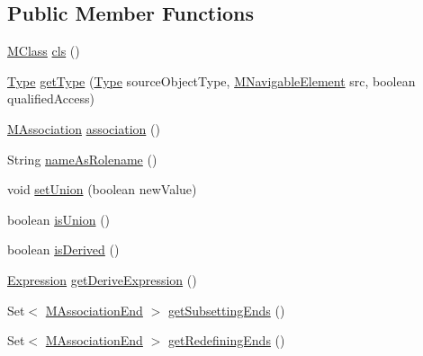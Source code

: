 \subsection*{Public Member Functions}
\begin{DoxyCompactItemize}
\item 
\hyperlink{interfaceorg_1_1tzi_1_1use_1_1uml_1_1mm_1_1_m_class}{M\-Class} \hyperlink{interfaceorg_1_1tzi_1_1use_1_1uml_1_1mm_1_1_m_navigable_element_a5965e78e0a14270855a4eea4418e1e4b}{cls} ()
\item 
\hyperlink{interfaceorg_1_1tzi_1_1use_1_1uml_1_1ocl_1_1type_1_1_type}{Type} \hyperlink{interfaceorg_1_1tzi_1_1use_1_1uml_1_1mm_1_1_m_navigable_element_af93a2b85491be095d44d8bd81a284258}{get\-Type} (\hyperlink{interfaceorg_1_1tzi_1_1use_1_1uml_1_1ocl_1_1type_1_1_type}{Type} source\-Object\-Type, \hyperlink{interfaceorg_1_1tzi_1_1use_1_1uml_1_1mm_1_1_m_navigable_element}{M\-Navigable\-Element} src, boolean qualified\-Access)
\item 
\hyperlink{interfaceorg_1_1tzi_1_1use_1_1uml_1_1mm_1_1_m_association}{M\-Association} \hyperlink{interfaceorg_1_1tzi_1_1use_1_1uml_1_1mm_1_1_m_navigable_element_a84e6a1dcb0d479069de1abbf5ce0e3ea}{association} ()
\item 
String \hyperlink{interfaceorg_1_1tzi_1_1use_1_1uml_1_1mm_1_1_m_navigable_element_ae92cdb143f0925873f506a2fec83373b}{name\-As\-Rolename} ()
\item 
void \hyperlink{interfaceorg_1_1tzi_1_1use_1_1uml_1_1mm_1_1_m_navigable_element_a1dfe3459df64ac976d37d1360c956d8d}{set\-Union} (boolean new\-Value)
\item 
boolean \hyperlink{interfaceorg_1_1tzi_1_1use_1_1uml_1_1mm_1_1_m_navigable_element_acb447f2a49a26ba1f5d0eabfe3680d62}{is\-Union} ()
\item 
boolean \hyperlink{interfaceorg_1_1tzi_1_1use_1_1uml_1_1mm_1_1_m_navigable_element_a1944a2f765c858dcb83fd659bd9d505e}{is\-Derived} ()
\item 
\hyperlink{classorg_1_1tzi_1_1use_1_1uml_1_1ocl_1_1expr_1_1_expression}{Expression} \hyperlink{interfaceorg_1_1tzi_1_1use_1_1uml_1_1mm_1_1_m_navigable_element_adbacf6023ed35da7ab5c5a32cb8fa0c5}{get\-Derive\-Expression} ()
\item 
Set$<$ \hyperlink{classorg_1_1tzi_1_1use_1_1uml_1_1mm_1_1_m_association_end}{M\-Association\-End} $>$ \hyperlink{interfaceorg_1_1tzi_1_1use_1_1uml_1_1mm_1_1_m_navigable_element_ad389beb51e21d7f629c89524331c117c}{get\-Subsetting\-Ends} ()
\item 
Set$<$ \hyperlink{classorg_1_1tzi_1_1use_1_1uml_1_1mm_1_1_m_association_end}{M\-Association\-End} $>$ \hyperlink{interfaceorg_1_1tzi_1_1use_1_1uml_1_1mm_1_1_m_navigable_element_aeec37afd39b4cf21cfb4535a69a83ccd}{get\-Redefining\-Ends} ()

\end{DoxyCompactItemize}
